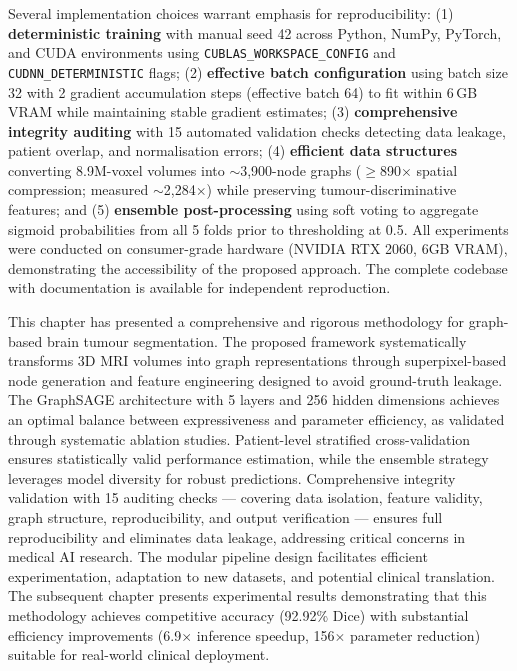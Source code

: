 Several implementation choices warrant emphasis for reproducibility: (1) \textbf{deterministic training} with manual seed 42 across Python, NumPy, PyTorch, and CUDA environments using \texttt{CUBLAS\_WORKSPACE\_CONFIG} and \texttt{CUDNN\_DETERMINISTIC} flags; (2) \textbf{effective batch configuration} using batch size 32 with 2 gradient accumulation steps (effective batch 64) to fit within 6\,GB VRAM while maintaining stable gradient estimates; (3) \textbf{comprehensive integrity auditing} with 15 automated validation checks detecting data leakage, patient overlap, and normalisation errors; (4) \textbf{efficient data structures} converting 8.9M-voxel volumes into $\sim$3,900-node graphs ($\geq$890$\times$ spatial compression; measured $\sim$2,284$\times$) while preserving tumour-discriminative features; and (5) \textbf{ensemble post-processing} using soft voting to aggregate sigmoid probabilities from all 5 folds prior to thresholding at 0.5. All experiments were conducted on consumer-grade hardware (NVIDIA RTX 2060, 6GB VRAM), demonstrating the accessibility of the proposed approach. The complete codebase with documentation is available for independent reproduction.

\vspace{5mm}

This chapter has presented a comprehensive and rigorous methodology for graph-based brain tumour segmentation. The proposed framework systematically transforms 3D MRI volumes into graph representations through superpixel-based node generation and feature engineering designed to avoid ground-truth leakage. The GraphSAGE architecture with 5 layers and 256 hidden dimensions achieves an optimal balance between expressiveness and parameter efficiency, as validated through systematic ablation studies. Patient-level stratified cross-validation ensures statistically valid performance estimation, while the ensemble strategy leverages model diversity for robust predictions. Comprehensive integrity validation with 15 auditing checks — covering data isolation, feature validity, graph structure, reproducibility, and output verification — ensures full reproducibility and eliminates data leakage, addressing critical concerns in medical AI research. The modular pipeline design facilitates efficient experimentation, adaptation to new datasets, and potential clinical translation. The subsequent chapter presents experimental results demonstrating that this methodology achieves competitive accuracy (92.92\% Dice) with substantial efficiency improvements (6.9$\times$ inference speedup, 156$\times$ parameter reduction) suitable for real-world clinical deployment.

\clearpage


